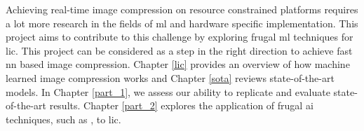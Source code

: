 Achieving real-time image compression on resource constrained platforms requires a lot more research in the fields of \acrshort{ml} and hardware specific implementation. This project aims to contribute to this challenge by exploring frugal \acrshort{ml} techniques for \acrshort{lic}. This project can be considered as a step in the right direction to achieve fast \acrshort{nn} based image compression. Chapter \ref{lic} provides an overview of how machine learned image compression works and Chapter \ref{sota} reviews state-of-the-art models. In Chapter \ref{part_1}, we assess our ability to replicate and evaluate state-of-the-art results. Chapter \ref{part_2} explores the application of frugal \acrfull{ai} techniques, such as , to \acrshort{lic}.